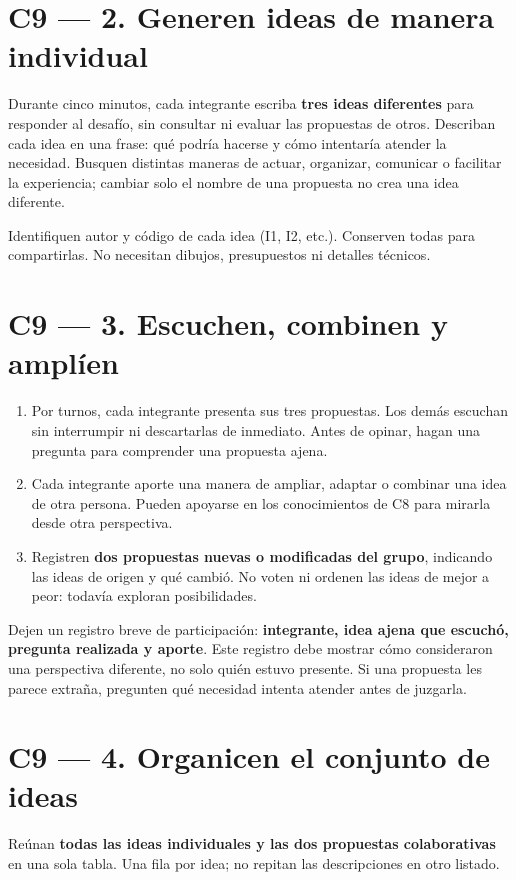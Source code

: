 \documentclass[12pt,a4paper]{article}
\begin{document}
\section*{C9 --- 2. Generen ideas de manera individual}
Durante cinco minutos, cada integrante escriba \textbf{tres ideas diferentes} para responder al desafío, sin consultar ni evaluar las propuestas de otros. Describan cada idea en una frase: qué podría hacerse y cómo intentaría atender la necesidad. Busquen distintas maneras de actuar, organizar, comunicar o facilitar la experiencia; cambiar solo el nombre de una propuesta no crea una idea diferente.

Identifiquen autor y código de cada idea (I1, I2, etc.). Conserven todas para compartirlas. No necesitan dibujos, presupuestos ni detalles técnicos.

\section*{C9 --- 3. Escuchen, combinen y amplíen}
\begin{enumerate}
\item Por turnos, cada integrante presenta sus tres propuestas. Los demás escuchan sin interrumpir ni descartarlas de inmediato. Antes de opinar, hagan una pregunta para comprender una propuesta ajena.
\item Cada integrante aporte una manera de ampliar, adaptar o combinar una idea de otra persona. Pueden apoyarse en los conocimientos de C8 para mirarla desde otra perspectiva.
\item Registren \textbf{dos propuestas nuevas o modificadas del grupo}, indicando las ideas de origen y qué cambió. No voten ni ordenen las ideas de mejor a peor: todavía exploran posibilidades.
\end{enumerate}
Dejen un registro breve de participación: \textbf{integrante, idea ajena que escuchó, pregunta realizada y aporte}. Este registro debe mostrar cómo consideraron una perspectiva diferente, no solo quién estuvo presente. Si una propuesta les parece extraña, pregunten qué necesidad intenta atender antes de juzgarla.

\section*{C9 --- 4. Organicen el conjunto de ideas}
Reúnan \textbf{todas las ideas individuales y las dos propuestas colaborativas} en una sola tabla. Una fila por idea; no repitan las descripciones en otro listado.
\end{document}
